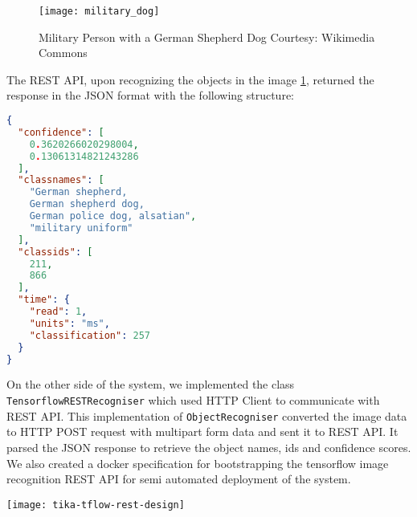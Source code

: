 \begin{figure}[h]
    \centering
    \texttt{[image: military\_dog]}
    \caption{Military Person with a German Shepherd Dog \newline Courtesy: Wikimedia Commons}
    \label{fig:military-dog}
\end{figure}
The REST API, upon recognizing the objects in the image \ref{fig:military-dog}, returned the response in the JSON format with the following structure:

\begin{lstlisting}[language=json, label=code:json-output,
	frame=single, xleftmargin=5.0pt, xrightmargin=5.0pt,
    caption=JSON Response from REST API]
{
  "confidence": [
    0.3620266020298004,
    0.13061314821243286
  ],
  "classnames": [
    "German shepherd,
    German shepherd dog,
    German police dog, alsatian",
    "military uniform"
  ],
  "classids": [
    211,
    866
  ],
  "time": {
    "read": 1,
    "units": "ms",
    "classification": 257
  }
}
\end{lstlisting}

On the other side of the system, we implemented the class \texttt{TensorflowRESTRecogniser} which used HTTP Client to communicate with REST API. This implementation of \texttt{ObjectRecogniser} converted the image data to HTTP POST request with multipart form data and sent it to REST API. It parsed the JSON response to retrieve the object names, ids and confidence scores. We also created a docker specification for bootstrapping the tensorflow image recognition REST API for semi automated deployment of the system.

\texttt{[image: tika-tflow-rest-design]}
